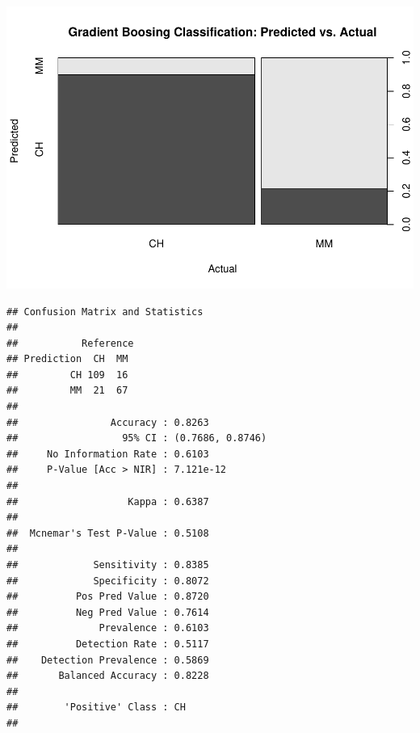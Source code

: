 \documentclass[
]{book}
\newenvironment{Shaded}{\begin{snugshade}}{\end{snugshade}}
\newcommand{\DataTypeTok}[1]{\textcolor[rgb]{0.13,0.29,0.53}{#1}}
\newcommand{\KeywordTok}[1]{\textcolor[rgb]{0.13,0.29,0.53}{\textbf{#1}}}
\newcommand{\NormalTok}[1]{#1}
\newcommand{\OperatorTok}[1]{\textcolor[rgb]{0.81,0.36,0.00}{\textbf{#1}}}
\newcommand{\StringTok}[1]{\textcolor[rgb]{0.31,0.60,0.02}{#1}}
\begin{document}
\includegraphics{data-sci_files/figure-latex/unnamed-chunk-106-2.pdf}

\begin{Shaded}
\end{Shaded}

\begin{verbatim}
## Confusion Matrix and Statistics
## 
##           Reference
## Prediction  CH  MM
##         CH 109  16
##         MM  21  67
##                                           
##                Accuracy : 0.8263          
##                  95% CI : (0.7686, 0.8746)
##     No Information Rate : 0.6103          
##     P-Value [Acc > NIR] : 7.121e-12       
##                                           
##                   Kappa : 0.6387          
##                                           
##  Mcnemar's Test P-Value : 0.5108          
##                                           
##             Sensitivity : 0.8385          
##             Specificity : 0.8072          
##          Pos Pred Value : 0.8720          
##          Neg Pred Value : 0.7614          
##              Prevalence : 0.6103          
##          Detection Rate : 0.5117          
##    Detection Prevalence : 0.5869          
##       Balanced Accuracy : 0.8228          
##                                           
##        'Positive' Class : CH              
## 
\end{verbatim}
\end{document}
